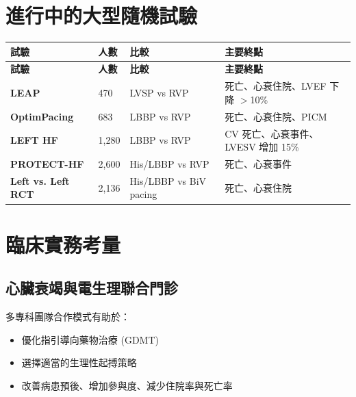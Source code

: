\documentclass[12pt,a4paper]{article}
\begin{document}

\section{進行中的大型隨機試驗}

\begin{longtable}{p{3cm}p{2cm}p{4cm}p{5cm}}
\toprule
\textbf{試驗} & \textbf{人數} & \textbf{比較} & \textbf{主要終點} \\
\midrule
\endfirsthead
\toprule
\textbf{試驗} & \textbf{人數} & \textbf{比較} & \textbf{主要終點} \\
\midrule
\endhead
\bottomrule
\endfoot

\textbf{LEAP} & 470 & LVSP vs RVP & 死亡、心衰住院、LVEF 下降 $>$10\% \\
\midrule

\textbf{OptimPacing} & 683 & LBBP vs RVP & 死亡、心衰住院、PICM \\
\midrule

\textbf{LEFT HF} & 1,280 & LBBP vs RVP & CV 死亡、心衰事件、LVESV 增加 15\% \\
\midrule

\textbf{PROTECT-HF} & 2,600 & His/LBBP vs RVP & 死亡、心衰事件 \\
\midrule

\textbf{Left vs. Left RCT} & 2,136 & His/LBBP vs BiV pacing & 死亡、心衰住院 \\
\bottomrule
\end{longtable}

\section{臨床實務考量}

\subsection{心臟衰竭與電生理聯合門診}

多專科團隊合作模式有助於：
\begin{itemize}
    \item 優化指引導向藥物治療 (GDMT)
    \item 選擇適當的生理性起搏策略
    \item 改善病患預後、增加參與度、減少住院率與死亡率
\end{itemize}
\end{document}
